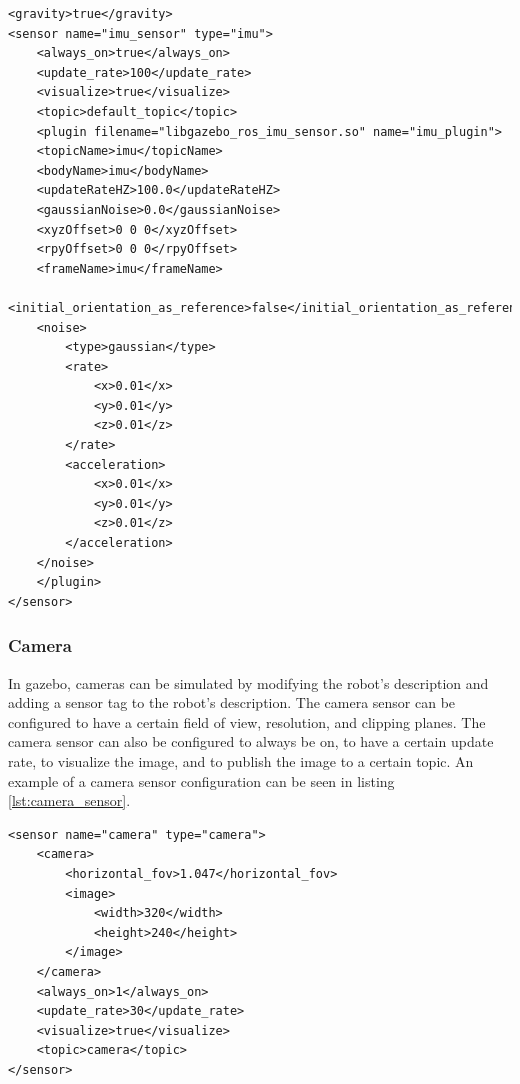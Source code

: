 \documentclass[12pt]{article}
\begin{document}
    \vspace{10pt }
\begin{minipage}{0.9\textwidth}
\begin{lstlisting}[style=xmlStyle, caption={IMU Sensor Configuration}, label={lst:imu_sensor}]
<gravity>true</gravity>
<sensor name="imu_sensor" type="imu">
    <always_on>true</always_on>
    <update_rate>100</update_rate>
    <visualize>true</visualize>
    <topic>default_topic</topic>
    <plugin filename="libgazebo_ros_imu_sensor.so" name="imu_plugin">
    <topicName>imu</topicName>
    <bodyName>imu</bodyName>
    <updateRateHZ>100.0</updateRateHZ>
    <gaussianNoise>0.0</gaussianNoise>
    <xyzOffset>0 0 0</xyzOffset>
    <rpyOffset>0 0 0</rpyOffset>
    <frameName>imu</frameName>
    <initial_orientation_as_reference>false</initial_orientation_as_reference>
    <noise>
        <type>gaussian</type>
        <rate>
            <x>0.01</x>
            <y>0.01</y>
            <z>0.01</z>
        </rate>
        <acceleration>
            <x>0.01</x>
            <y>0.01</y>
            <z>0.01</z>
        </acceleration>
    </noise>
    </plugin>
</sensor>
\end{lstlisting}
\end{minipage}

        \subsubsection{Camera}

        In gazebo, cameras can be simulated by modifying the robot's description and adding a sensor tag to the robot's description. The camera sensor can be configured to have a certain field of view, resolution, and clipping planes. The camera sensor can also be configured to always be on, to have a certain update rate, to visualize the image, and to publish the image to a certain topic. An example of a camera sensor configuration can be seen in listing \ref{lst:camera_sensor}.

\vspace{10pt }
\begin{minipage}{0.9\textwidth}
\begin{lstlisting}[style=xmlStyle, caption={Camera Sensor Configuration}, label={lst:camera_sensor}]
<sensor name="camera" type="camera">
    <camera>
        <horizontal_fov>1.047</horizontal_fov>
        <image>
            <width>320</width>
            <height>240</height>
        </image>
    </camera>
    <always_on>1</always_on>
    <update_rate>30</update_rate>
    <visualize>true</visualize>
    <topic>camera</topic>
</sensor>
\end{lstlisting}
\end{minipage}
\end{document}
